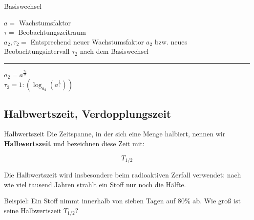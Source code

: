 \begin{gesetz}{Basiswechsel}{}

  \begin{center}\end{center}

 
  $a=$ Wachstumsfaktor\\
  $\tau=$ Beobachtungszeitraum\\
  $a_2, \tau_2=$ Entsprechend neuer Wachstumsfaktor $a_2$ bzw. neues
  Beobachtungsintervall $\tau_2$ nach dem Basiswechsel\\
  \hrule
  \vspace{3mm}
\begin{center}\end{center}
  \vspace{3mm}
  $a_2 = a^{\frac{\tau_2}{\tau}}$\\
  \vspace{3mm}
  $\tau_2=1 : \left(\log_{a_2}\left(a^\frac1\tau\right)\right)$\\
\end{gesetz}
\newpage


\subsection{Halbwertszeit, Verdopplungszeit}

\begin{definition}{Halbwertszeit}{}
Die Zeitspanne, in der sich eine Menge halbiert, nennen wir
\textbf{Halbwertszeit} und bezeichnen diese Zeit mit:

$$T_{1/2}$$
\end{definition}

Die Halbwertszeit wird insbesondere
  beim radioaktiven Zerfall verwendet: nach wie viel tausend Jahren strahlt
  ein Stoff nur noch die Hälfte.


Beispiel: Ein Stoff nimmt innerhalb von sieben Tagen auf 80\% ab. Wie
groß ist seine Halbwertszeit $T_{1/2}$?

